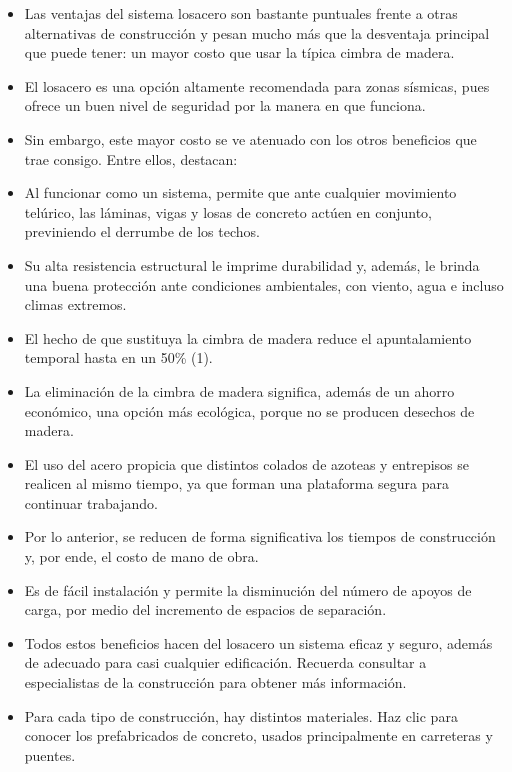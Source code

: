 \documentclass[12pt]{article}
\begin{document}
	\begin{itemize}
		\item Las ventajas del sistema losacero son bastante puntuales frente a otras alternativas de construcción y pesan mucho más que la desventaja principal que puede tener: un mayor costo que usar la típica cimbra de madera.
		
		\item El losacero es una opción altamente recomendada para zonas sísmicas, pues ofrece un buen nivel de seguridad por la manera en que funciona.
		
		\item Sin embargo, este mayor costo se ve atenuado con los otros beneficios que trae consigo. Entre ellos, destacan:
		
		\item Al funcionar como un sistema, permite que ante cualquier movimiento telúrico, las láminas, vigas y losas de concreto actúen en conjunto, previniendo el derrumbe de los techos.
		
		\item Su alta resistencia estructural le imprime durabilidad y, además, le brinda una buena protección ante condiciones ambientales, con viento, agua e incluso climas extremos.
		
		\item El hecho de que sustituya la cimbra de madera reduce el apuntalamiento temporal hasta en un 50\% (1).
		
		\item La eliminación de la cimbra de madera significa, además de un ahorro económico, una opción más ecológica, porque no se producen desechos de madera.
		
		\item El uso del acero propicia que distintos colados de azoteas y entrepisos se realicen al mismo tiempo, ya que forman una plataforma segura para continuar trabajando.
		
		\item Por lo anterior, se reducen de forma significativa los tiempos de construcción y, por ende, el costo de mano de obra.
		
		\item Es de fácil instalación y permite la disminución del número de apoyos de carga, por medio del incremento de espacios de separación.
		
		\item Todos estos beneficios hacen del losacero un sistema eficaz y seguro, además de adecuado para casi cualquier edificación. Recuerda consultar a especialistas de la construcción para obtener más información.
		
		\item Para cada tipo de construcción, hay distintos materiales. Haz clic para conocer los prefabricados de concreto, usados principalmente en carreteras y puentes.
	\end{itemize}
		
\end{document}
